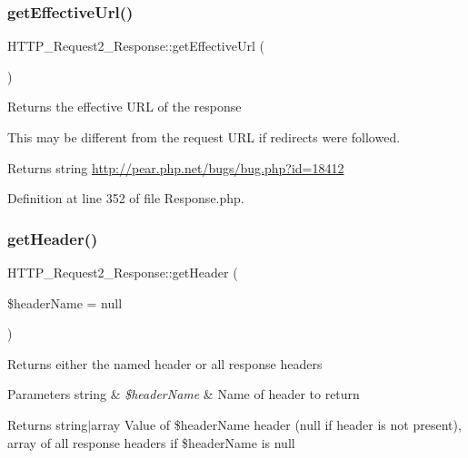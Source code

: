 \subsubsection{\texorpdfstring{get\+Effective\+Url()}{getEffectiveUrl()}}
{\footnotesize\ttfamily H\+T\+T\+P\+\_\+\+Request2\+\_\+\+Response\+::get\+Effective\+Url (\begin{DoxyParamCaption}{ }\end{DoxyParamCaption})}

Returns the effective U\+RL of the response

This may be different from the request U\+RL if redirects were followed.

\begin{DoxyReturn}{Returns}
string \hyperlink{}{http\+://pear.\+php.\+net/bugs/bug.\+php?id=18412}
\end{DoxyReturn}


Definition at line 352 of file Response.\+php.

\hypertarget{classHTTP__Request2__Response_a4fcafd1538662af1415ccf12cae68c62}{}\label{classHTTP__Request2__Response_a4fcafd1538662af1415ccf12cae68c62} 
\subsubsection{\texorpdfstring{get\+Header()}{getHeader()}}
{\footnotesize\ttfamily H\+T\+T\+P\+\_\+\+Request2\+\_\+\+Response\+::get\+Header (\begin{DoxyParamCaption}\item[{}]{\$header\+Name = {\ttfamily null} }\end{DoxyParamCaption})}

Returns either the named header or all response headers


\begin{DoxyParams}[1]{Parameters}
string & {\em \$header\+Name} & Name of header to return\\
\hline
\end{DoxyParams}
\begin{DoxyReturn}{Returns}
string$\vert$array Value of \$header\+Name header (null if header is not present), array of all response headers if \$header\+Name is null 
\end{DoxyReturn}


